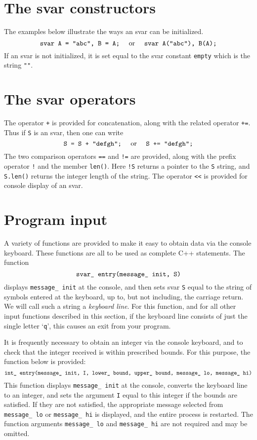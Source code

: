 \section{The svar constructors}
The examples below illustrate the ways an svar can be initialized.
$$\hbox{{\tt svar A = "abc", B = A;} \quad or \quad
{\tt svar A("abc"), B(A);}}$$
If an svar is not initialized, it is set equal to the svar constant 
{\tt empty} which is the string {\tt ""}.

\section{The svar operators}
The operator {\tt +} is provided for concatenation, along with 
the related operator {\tt +=}. Thus if {\tt S} is an svar, then one can write
$$\hbox{{\tt S = S + "defgh";} \quad or \quad {\tt S += "defgh";}}$$
The two comparison operators {\tt ==} and {\tt !=} are provided, along with
the prefix operator {\tt !} and the member {\tt len()}. Here {\tt !S} returns a 
pointer to the {\tt S} string, and {\tt S.len()} returns the integer length
of the string. The operator {\tt <<} is provided for console display of
an svar.

\section{Program input}
A variety of functions are provided to make it easy to obtain data via
the console keyboard. These functions are all to be used as
complete C++ statements. The function
$$\hbox{\tt svar\_ entry(message\_ init, S)}$$
displays {\tt message\_ init} at the console, and then sets svar {\tt S} equal
to the string of symbols entered at the keyboard, up to, but not including, the
carriage return. We will call such a string a {\sl keyboard line}. For this
function, and for all other input functions described in this section,
if the keyboard line consists of just the single letter `{\tt q}', this
causes an exit from your program.

It is frequently necessary to obtain an integer via the console keyboard, and
to check that the integer received is within prescribed bounds. For this
purpose, the function below is provided:
$$\hbox{\tt int\_ entry(message\_ init, I,
lower\_ bound, upper\_ bound, message\_ lo, message\_ hi)}$$
This function displays {\tt message\_ init} at the console, converts the
keyboard line to an integer, and sets the argument {\tt I} equal to this
integer if the bounds are satisfied. If they are not satisfied, the
appropriate message selected from {\tt message\_ lo} or {\tt message\_ hi}
is displayed, and the entire process is restarted. The function
arguments {\tt message\_ lo} and {\tt message\_ hi} are not required
and may be omitted.

